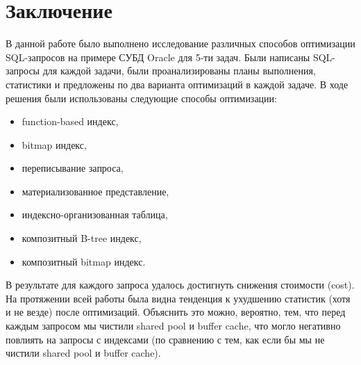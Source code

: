 \chapter*{Заключение} \label{ch-conclusion}

В данной работе было выполнено исследование различных способов оптимизации SQL-запросов на примере СУБД Oracle для 5-ти задач. Были написаны SQL-запросы для каждой задачи, были проанализированы планы выполнения, статистики и предложены по два варианта оптимизаций в каждой задаче. В ходе решения были использованы следующие способы оптимизации:
\begin{itemize}%
  \item function-based индекс,
  \item bitmap индекс,
  \item переписывание запроса,
  \item материализованное представление,
  \item индексно-организованная таблица,
  \item композитный B-tree индекс,
  \item композитный bitmap индекс.
\end{itemize}

В результате для каждого запроса удалось достигнуть снижения стоимости (cost).
На протяжении всей работы была видна тенденция к ухудшению статистик (хотя и не везде) после оптимизаций.
Объяснить это можно, вероятно, тем, что перед каждым запросом мы чистили shared pool и buffer cache, что могло негативно повлиять на запросы с индексами (по сравнению с тем, как если бы мы не чистили shared pool и buffer cache).

